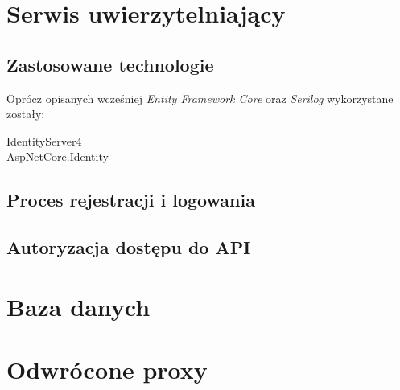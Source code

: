 \section{Serwis uwierzytelniający}
	\subsection{Zastosowane technologie}
		Oprócz opisanych wcześniej \emph{Entity Framework Core} oraz \emph{Serilog} wykorzystane zostały:
		\begin{description}
			\item[IdentityServer4] 
			\item[AspNetCore.Identity] 
		\end{description}

	\subsection{Proces rejestracji i logowania}

	\subsection{Autoryzacja dostępu do API}

\section{Baza danych}

\section{Odwrócone proxy}